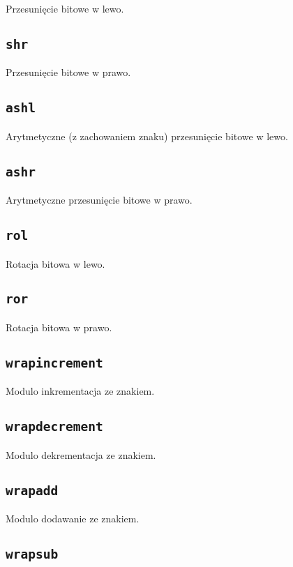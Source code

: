 Przesunięcie bitowe w lewo.

\subsection{\texttt{shr}}

Przesunięcie bitowe w prawo.

\subsection{\texttt{ashl}}

Arytmetyczne (z zachowaniem znaku) przesunięcie bitowe w lewo.

\subsection{\texttt{ashr}}

Arytmetyczne przesunięcie bitowe w prawo.

\subsection{\texttt{rol}}

Rotacja bitowa w lewo.

\subsection{\texttt{ror}}

Rotacja bitowa w prawo.

\subsection{\texttt{wrapincrement}}

Modulo inkrementacja ze znakiem.

\subsection{\texttt{wrapdecrement}}

Modulo dekrementacja ze znakiem.

\subsection{\texttt{wrapadd}}

Modulo dodawanie ze znakiem.

\subsection{\texttt{wrapsub}}

